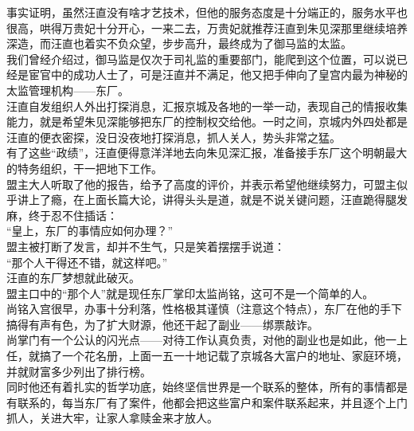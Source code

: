 \begin{multicols}{\theparacolNo}
事实证明，虽然汪直没有啥才艺技术，但他的服务态度是十分端正的，服务水平也很高，哄得万贵妃十分开心，一来二去，万贵妃就推荐汪直到朱见深那里继续培养深造，而汪直也着实不负众望，步步高升，最终成为了御马监的太监。\\

我们曾经介绍过，御马监是仅次于司礼监的重要部门，能爬到这个位置，可以说已经是宦官中的成功人士了，可是汪直并不满足，他又把手伸向了皇宫内最为神秘的太监管理机构——东厂。\\

汪直自发组织人外出打探消息，汇报京城及各地的一举一动，表现自己的情报收集能力，就是希望朱见深能够把东厂的控制权交给他。一时之间，京城内外四处都是汪直的便衣密探，没日没夜地打探消息，抓人关人，势头非常之猛。\\

有了这些“政绩”，汪直便得意洋洋地去向朱见深汇报，准备接手东厂这个明朝最大的特务组织，干一把地下工作。\\

盟主大人听取了他的报告，给予了高度的评价，并表示希望他继续努力，可盟主似乎讲上了瘾，在上面长篇大论，讲得头头是道，就是不说关键问题，汪直跪得腿发麻，终于忍不住插话：\\

“皇上，东厂的事情应如何办理？”\\

盟主被打断了发言，却并不生气，只是笑着摆摆手说道：\\

“那个人干得还不错，就这样吧。”\\

汪直的东厂梦想就此破灭。\\

盟主口中的“那个人”就是现任东厂掌印太监尚铭，这可不是一个简单的人。\\

尚铭入宫很早，办事十分利落，性格极其谨慎（注意这个特点），东厂在他的手下搞得有声有色，为了扩大财源，他还干起了副业——绑票敲诈。\\

尚掌门有一个公认的闪光点——对待工作认真负责，对他的副业也是如此，他一上任，就搞了一个花名册，上面一五一十地记载了京城各大富户的地址、家庭环境，并就财富多少列出了排行榜。\\

同时他还有着扎实的哲学功底，始终坚信世界是一个联系的整体，所有的事情都是有联系的，每当东厂有了案件，他都会把这些富户和案件联系起来，并且逐个上门抓人，关进大牢，让家人拿赎金来才放人。\\


\end{multicols}
